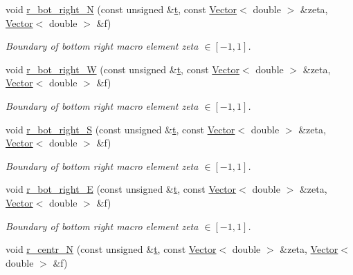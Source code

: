 \begin{DoxyCompactItemize}
void \hyperlink{classoomph_1_1QuarterCircleSectorDomain_ad937b0da664b5c01063e7f8de6427fce}{r\+\_\+bot\+\_\+right\+\_\+N} (const unsigned \&\hyperlink{cfortran_8h_af6f0bd3dc13317f895c91323c25c2b8f}{t}, const \hyperlink{classoomph_1_1Vector}{Vector}$<$ double $>$ \&zeta, \hyperlink{classoomph_1_1Vector}{Vector}$<$ double $>$ \&f)
\begin{DoxyCompactList}\small\item\em Boundary of bottom right macro element zeta $ \in [-1,1] $. \end{DoxyCompactList}\item 
void \hyperlink{classoomph_1_1QuarterCircleSectorDomain_a85ba295aaeff2833644691978deac247}{r\+\_\+bot\+\_\+right\+\_\+W} (const unsigned \&\hyperlink{cfortran_8h_af6f0bd3dc13317f895c91323c25c2b8f}{t}, const \hyperlink{classoomph_1_1Vector}{Vector}$<$ double $>$ \&zeta, \hyperlink{classoomph_1_1Vector}{Vector}$<$ double $>$ \&f)
\begin{DoxyCompactList}\small\item\em Boundary of bottom right macro element zeta $ \in [-1,1] $. \end{DoxyCompactList}\item 
void \hyperlink{classoomph_1_1QuarterCircleSectorDomain_a552f9bfc6fd451669f44ee02c8bb0d38}{r\+\_\+bot\+\_\+right\+\_\+S} (const unsigned \&\hyperlink{cfortran_8h_af6f0bd3dc13317f895c91323c25c2b8f}{t}, const \hyperlink{classoomph_1_1Vector}{Vector}$<$ double $>$ \&zeta, \hyperlink{classoomph_1_1Vector}{Vector}$<$ double $>$ \&f)
\begin{DoxyCompactList}\small\item\em Boundary of bottom right macro element zeta $ \in [-1,1] $. \end{DoxyCompactList}\item 
void \hyperlink{classoomph_1_1QuarterCircleSectorDomain_abb05f2e719d81f167fc0f608e80c5696}{r\+\_\+bot\+\_\+right\+\_\+E} (const unsigned \&\hyperlink{cfortran_8h_af6f0bd3dc13317f895c91323c25c2b8f}{t}, const \hyperlink{classoomph_1_1Vector}{Vector}$<$ double $>$ \&zeta, \hyperlink{classoomph_1_1Vector}{Vector}$<$ double $>$ \&f)
\begin{DoxyCompactList}\small\item\em Boundary of bottom right macro element zeta $ \in [-1,1] $. \end{DoxyCompactList}\item 
void \hyperlink{classoomph_1_1QuarterCircleSectorDomain_a1cb12e9b1d2e17f8bd5c3d6691be3b1d}{r\+\_\+centr\+\_\+N} (const unsigned \&\hyperlink{cfortran_8h_af6f0bd3dc13317f895c91323c25c2b8f}{t}, const \hyperlink{classoomph_1_1Vector}{Vector}$<$ double $>$ \&zeta, \hyperlink{classoomph_1_1Vector}{Vector}$<$ double $>$ \&f)

\end{DoxyCompactItemize}
